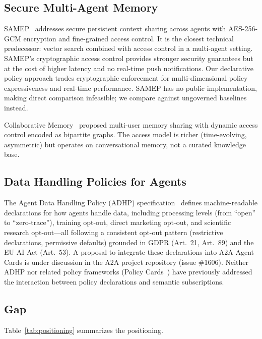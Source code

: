 \documentclass[11pt]{article}
\begin{document}
\subsection{Secure Multi-Agent Memory}

SAMEP~\cite{masoor2025} addresses secure persistent context sharing across agents with AES-256-GCM encryption and fine-grained access control. It is the closest technical predecessor: vector search combined with access control in a multi-agent setting. SAMEP's cryptographic access control provides stronger security guarantees but at the cost of higher latency and no real-time push notifications. Our declarative policy approach trades cryptographic enforcement for multi-dimensional policy expressiveness and real-time performance. SAMEP has no public implementation, making direct comparison infeasible; we compare against ungoverned baselines instead.

Collaborative Memory~\cite{rezazadeh2025} proposed multi-user memory sharing with dynamic access control encoded as bipartite graphs. The access model is richer (time-evolving, asymmetric) but operates on conversational memory, not a curated knowledge base.

\subsection{Data Handling Policies for Agents}

The Agent Data Handling Policy (ADHP) specification~\cite{johnson2025adhp} defines machine-readable declarations for how agents handle data, including processing levels (from ``open'' to ``zero-trace''), training opt-out, direct marketing opt-out, and scientific research opt-out---all following a consistent opt-out pattern (restrictive declarations, permissive defaults) grounded in GDPR (Art.~21, Art.~89) and the EU AI Act (Art.~53). A proposal to integrate these declarations into A2A Agent Cards is under discussion in the A2A project repository (issue \#1606). Neither ADHP nor related policy frameworks (Policy Cards~\cite{mavracic2025}) have previously addressed the interaction between policy declarations and semantic subscriptions.

\subsection{Gap}

Table~\ref{tab:positioning} summarizes the positioning.
\end{document}
